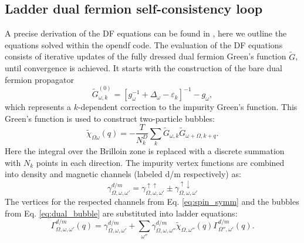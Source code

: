 \documentclass[3p,times,procedia]{elsarticle}
\begin{document}
\subsection{Ladder dual fermion self-consistency loop}
A precise derivation of the DF equations can be found in \cite{Hafermann2012, Antipov2014}, here we outline the equations solved within the opendf code. The evaluation of the DF equations consists of iterative updates of the fully dressed dual fermion Green's function $\tilde G$, until convergence is achieved. It starts with the construction of the bare dual fermion propagator
\begin{equation}
\tilde G^{(0)}_{\omega,k} = \left[g_{\omega}^{-1} + \Delta_\omega - \varepsilon_k\right]^{-1} - g_{\omega}, \label{eq:gd0}
\end{equation}
which represents a $k$-dependent correction to the impurity Green's function. This Green's function is used to construct two-particle bubbles: 
\begin{equation}\label{eq:dual_bubble}
\tilde \chi_{\Omega\omega}(q) = -\frac{T}{N_k^D} \sum_k \tilde G_{\omega, k} \tilde G_{\omega + \Omega, k+q}.
\end{equation}
Here the integral over the Brilloin zone is replaced with a discrete summation with $N_k$ points in each direction. The impurity vertex functions are combined into density and magnetic channels (labeled d/m respectively) as: 
\begin{equation}\label{eq:spin_symm}
\gamma^{d/m}_{\Omega,\omega,\omega'} = \gamma^{\uparrow\uparrow}_{\Omega,\omega,\omega'} \pm \gamma^{\uparrow\downarrow}_{\Omega,\omega,\omega'}
\end{equation}
The vertices for the respected channels from Eq. \ref{eq:spin_symm} and the bubbles from Eq. \ref{eq:dual_bubble} are substituted into ladder equations:
\begin{equation}\label{eq:dual_ladder}
\Gamma^{d/m}_{\Omega,\omega,\omega'}(q) = \gamma^{d/m}_{\Omega,\omega,\omega'} + \sum_{\omega''} \gamma^{d/m}_{\Omega,\omega,\omega''} \tilde\chi_{\Omega,\omega''}(q) \Gamma^{d/m}_{\Omega'',\omega'}(q).
\end{equation}
\end{document}
